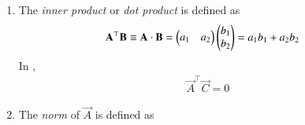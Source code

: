\begin{enumerate}[label=\thesection.\arabic*.,ref=\thesection.\theenumi]
		\iffalse
	\item A {\em matrix} of the form 
\begin{align}
  \vec{A} \triangleq  \myvec{a_1\\a_2} 
\end{align}
		is defined be  {\em column vector}, or simply, vector.
	In 
\figref{fig:tri_right_angle}	
		the point vectors $\vec{A}, \vec{B}, \vec{C}$ can be defined as
\begin{align}
\vec{A} = \myvec{0 \\ c},\,
\vec{B} = \myvec{0 \\ 0},\,
\vec{C} = \myvec{a \\ 0}
\end{align}
\item 
\begin{align}
  \lambda\vec{A} \triangleq  \myvec{\lambda a_1\\ \lambda a_2} 
\end{align}
\item For 
\begin{align}
	\vec{B} &= 	\myvec{b_1 \\ b_2},
	\\
	\vec{A}+ 
	\vec{B} &= \myvec{a_1 \\ a_2}+	\myvec{b_1 \\ b_2} = 
	 \myvec{a_1 +b_1 \\ a_2 +b_2} 
\end{align}
  \item  The transpose of $\vec{A}$ is the {\em row vector} defined as
\begin{align}
  \label{eq:transpose2d}
  \vec{A}^{\top}  = \myvec{a_1 & a_2}
\end{align}
%
\fi
\item The {\em inner product} or {\em dot product} is defined as
  \label{prop:dot2d}
\begin{align}
  \label{eq:dot2d}
  \mathbf{A}^{\top} \mathbf{B} &\equiv \mathbf{A} \cdot \mathbf{B} 
  = \begin{pmatrix}a_1 & a_2\end{pmatrix} \begin{pmatrix}b_1 \\ b_2\end{pmatrix}= a_1b_1+a_2b_2 
\end{align}
%
	In 
,	
\begin{align}
  \label{eq:dot2d-orth}
  \vec{A}^{\top} \vec{C}  = 0
\end{align}
\item The {\em norm} of $\vec{A}$ is defined as
\begin{align}
  \label{eq:norm2d}

\end{align}
\end{enumerate}
